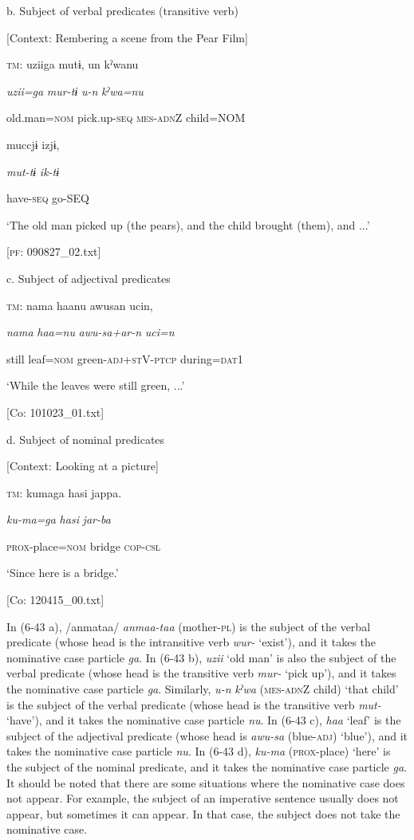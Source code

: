   b.  Subject of verbal predicates (transitive verb)

    [Context: Rembering a scene from the Pear Film]

    \textsc{tm}:  uziiga  mutɨ,  un  kˀwanu

      \textit{uzii=ga}  \textit{mur-tɨ}  \textit{u-n}  \textit{kˀwa=nu}

      old.man=\textsc{nom}  pick.up-\textsc{seq}  \textsc{mes}-\textsc{adn}Z  child=NOM

      muccjɨ  izjɨ,

      \textit{mut-tɨ}  \textit{ik-tɨ}

      have-\textsc{seq}  go-SEQ

      ‘The old man picked up (the pears), and the child brought (them), and ...’

      [\textsc{pf}: 090827\_02.txt]

  c.  Subject of adjectival predicates

    \textsc{tm}:  nama  haanu  awusan  ucin,

      \textit{nama}  \textit{haa=nu}  \textit{awu-sa+ar-n}  \textit{uci=n}

      still  leaf=\textsc{nom}  green-\textsc{adj}+\textsc{st}V-\textsc{ptcp}  during=\textsc{dat}1

      ‘While the leaves were still green, ...’

      [Co: 101023\_01.txt]

  d.  Subject of nominal predicates

    [Context: Looking at a picture]

    \textsc{tm}:  kumaga  hasi  jappa.

      \textit{ku-ma=ga}  \textit{hasi}  \textit{jar-ba}

      \textsc{prox}-place=\textsc{nom}  bridge  \textsc{cop}-\textsc{csl}

      ‘Since here is a bridge.’

      [Co: 120415\_00.txt]

In (6-43 a), /anmataa/ \textit{anmaa-taa} (mother-\textsc{pl}) is the subject of the verbal predicate (whose head is the intransitive verb \textit{wur-} ‘exist’), and it takes the nominative case particle \textit{ga}. In (6-43 b), \textit{uzii} ‘old man’ is also the subject of the verbal predicate (whose head is the transitive verb \textit{mur-} ‘pick up’), and it takes the nominative case particle \textit{ga}. Similarly, \textit{u-n} \textit{kˀwa} (\textsc{mes}-\textsc{adn}Z child) ‘that child’ is the subject of the verbal predicate (whose head is the transitive verb \textit{mut-} ‘have’), and it takes the nominative case particle \textit{nu}. In (6-43 c), \textit{haa} ‘leaf’ is the subject of the adjectival predicate (whose head is \textit{awu-sa} (blue-\textsc{adj}) ‘blue’), and it takes the nominative case particle \textit{nu}. In (6-43 d), \textit{ku-ma} (\textsc{prox}-place) ‘here’ is the subject of the nominal predicate, and it takes the nominative case particle \textit{ga}. It should be noted that there are some situations where the nominative case does not appear. For example, the subject of an imperative sentence usually does not appear, but sometimes it can appear. In that case, the subject does not take the nominative case.

